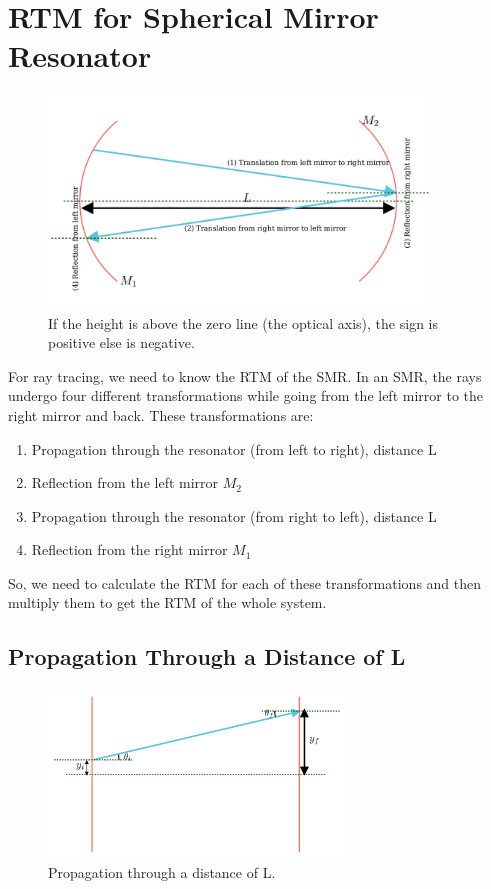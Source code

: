 \documentclass[12pt]{article}
\begin{document}
\section{RTM for Spherical Mirror Resonator}
\begin{figure}[h]
    \centering
    \includegraphics[width=0.9\textwidth]{images/round_trip.png}
    \caption{If the height is above the zero line (the optical axis), the sign is positive else is negative.}
    \label{fig:round-trip}
\end{figure}

For ray tracing, we need to know the RTM of the SMR. In an SMR, the rays undergo four different transformations while going from the left mirror to the right mirror and back. These transformations are:
\begin{enumerate}
    \item Propagation through the resonator (from left to right), distance L
    \item Reflection from the left mirror \(M_2\)
    \item Propagation through the resonator (from right to left), distance L
    \item Reflection from the right mirror \(M_1\)
\end{enumerate}

So, we need to calculate the RTM for each of these transformations and then multiply them to get the RTM of the whole system.

\subsection{Propagation Through a Distance of L}
\begin{figure}[h]
    \centering
    \includegraphics[width=0.7\textwidth]{images/translation.png}
    \caption{Propagation through a distance of L.}
    \label{fig:translation}
\end{figure}
\end{document}
